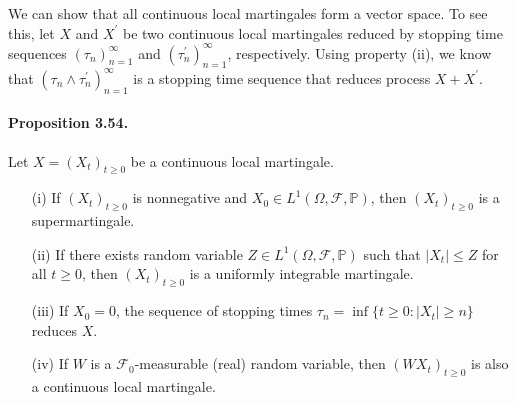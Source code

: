 \documentclass{article}
\numberwithin{equation}{section}
\renewcommand{\P}{\mathbb{P}}
\theoremstyle{plain}
\theoremstyle{definition}
\begin{document}
We can show that all continuous local martingales form a vector space. To see this, let $X$ and $X^\prime$ be two continuous local martingales reduced by stopping time sequences $(\tau_n)_{n=1}^\infty$ and $(\tau_n^\prime)_{n=1}^\infty$, respectively. Using property (ii), we know that $(\tau_n\wedge\tau_n^\prime)_{n=1}^\infty$ is a stopping time sequence that reduces process $X+X^\prime$.

\paragraph{Proposition 3.54.\label{prop:3.54}} Let $X=(X_t)_{t\geq 0}$ be a continuous local martingale.
\begin{itemize}
	\item[(i)] If $(X_t)_{t\geq 0}$ is nonnegative and $X_0\in L^1(\Omega,\mathscr{F},\P)$, then $(X_t)_{t\geq 0}$ is a supermartingale.
	\item[(ii)] If there exists random variable $Z\in L^1(\Omega,\mathscr{F},\P)$ such that $\vert X_t\vert\leq Z$ for all $t\geq 0$, then $(X_t)_{t\geq 0}$ is a uniformly integrable martingale.
	\item[(iii)] If $X_0=0$, the sequence of stopping times $\tau_n=\inf\{t\geq 0:\vert X_t\vert\geq n\}$ reduces $X$.
	\item[(iv)] If $W$ is a $\mathscr{F}_0$-measurable (real) random variable, then $(WX_t)_{t\geq 0}$ is also a continuous local martingale.
\end{itemize}
\end{document}
